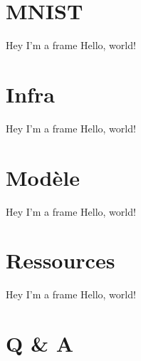 \documentclass{beamer}
\begin{document}
\section{MNIST}
\label{sec:mnist}
\begin{frame}{Hey I'm a frame}
  Hello, world!
\end{frame}

\section{Infra}
\label{sec:infra}
\begin{frame}{Hey I'm a frame}
  Hello, world!
\end{frame}

\section{Modèle}
\label{sec:model}
\begin{frame}{Hey I'm a frame}
  Hello, world!
\end{frame}

\section{Ressources}
\label{sec:resources}
\begin{frame}{Hey I'm a frame}
  Hello, world!
\end{frame}

\section{Q \& A}
\label{sec:qa}
\end{document}
